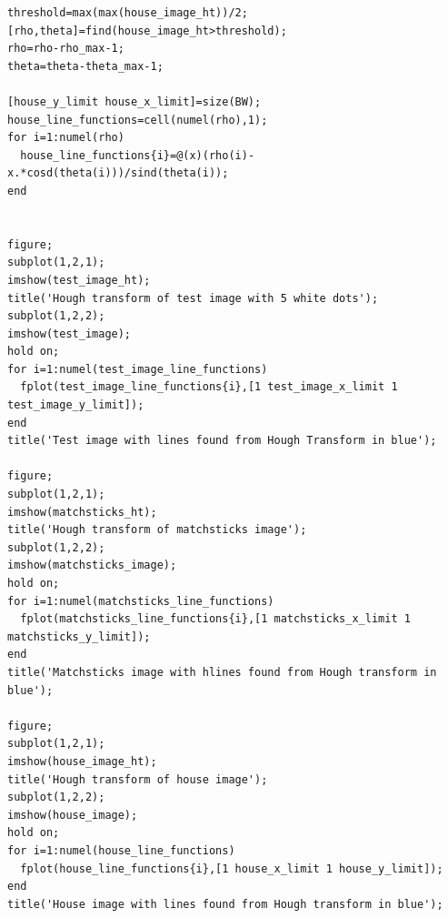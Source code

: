 \documentclass{article}
\begin{document}
\begin{verbatim}
threshold=max(max(house_image_ht))/2;
[rho,theta]=find(house_image_ht>threshold);
rho=rho-rho_max-1;
theta=theta-theta_max-1;

[house_y_limit house_x_limit]=size(BW);
house_line_functions=cell(numel(rho),1);
for i=1:numel(rho)
  house_line_functions{i}=@(x)(rho(i)-x.*cosd(theta(i)))/sind(theta(i));
end


figure;
subplot(1,2,1);
imshow(test_image_ht);
title('Hough transform of test image with 5 white dots');
subplot(1,2,2);
imshow(test_image);
hold on;
for i=1:numel(test_image_line_functions)
  fplot(test_image_line_functions{i},[1 test_image_x_limit 1 test_image_y_limit]);
end
title('Test image with lines found from Hough Transform in blue');

figure;
subplot(1,2,1);
imshow(matchsticks_ht);
title('Hough transform of matchsticks image');
subplot(1,2,2);
imshow(matchsticks_image);
hold on;
for i=1:numel(matchsticks_line_functions)
  fplot(matchsticks_line_functions{i},[1 matchsticks_x_limit 1 matchsticks_y_limit]);
end
title('Matchsticks image with hlines found from Hough transform in blue');

figure;
subplot(1,2,1);
imshow(house_image_ht);
title('Hough transform of house image');
subplot(1,2,2);
imshow(house_image);
hold on;
for i=1:numel(house_line_functions)
  fplot(house_line_functions{i},[1 house_x_limit 1 house_y_limit]);
end
title('House image with lines found from Hough transform in blue');
\end{verbatim}
\newpage
\end{document}
